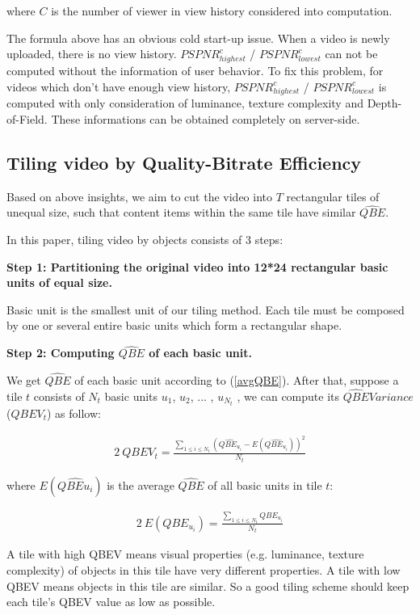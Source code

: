 where $C$ is the number of viewer in view history considered into computation.

The formula above has an obvious cold start-up issue. When a video is newly uploaded, there is no view history. $PSPNR_{highest}^c$ / $PSPNR_{lowest}^c$ can not be computed without the information of user behavior. To fix this problem, for videos which don't have enough view history, $PSPNR_{highest}^c$ / $PSPNR_{lowest}^c$ is computed with only consideration of luminance, texture complexity and Depth-of-Field. These informations can be obtained completely on server-side.

\subsection{Tiling video by Quality-Bitrate Efficiency}

Based on above insights, we aim to cut the video into $T$ rectangular tiles of unequal size, such that content items within the same tile have similar $\hat{QBE}$.

In this paper, tiling video by objects consists of 3 steps:

\textbf{Step 1: Partitioning the original video into 12*24 rectangular basic units of equal size.} 

Basic unit is the smallest unit of our tiling method. Each tile must be composed by one or several entire basic units which form a rectangular shape.

\textbf{Step 2: Computing $\hat{QBE}$ of each basic unit.}

We get $\hat{QBE}$ of each basic unit according to (\ref{avgQBE}). After that, suppose a tile $t$ consists of $N_t$ basic units $u_1$, $u_2$, ... , $u_{N_t}$ , we can compute its $\hat{QBE} Variance$ ($QBEV_t$) as follow:

\begin{alignat}{2}\
QBEV_t = \frac{\sum_{1 \le i \le N_{t}}{(\hat{QBE_{u_i}} - E(\hat{QBE_{u_{i}}}))^2}}{N_t}
\end{alignat}

where $E(\hat{QBE{u_i}})$ is the average $\hat{QBE}$ of all basic units in tile $t$:

\begin{alignat}{2}\
E(QBE_{u_i}) = \frac{\sum_{1 \le i \le N_{t}}{QBE_{u_i}}}{N_t}
\end{alignat}

A tile with high QBEV means visual properties (e.g. luminance, texture complexity) of objects in this tile have very different properties. A tile with low QBEV means objects in this tile are similar. So a good tiling scheme should keep each tile's QBEV value as low as possible.

